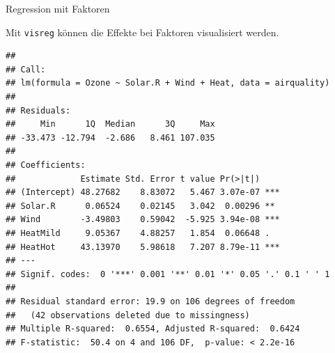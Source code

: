 \documentclass[ignorenonframetext,]{beamer}
\newenvironment{Shaded}{}{}
\newcommand{\KeywordTok}[1]{\textcolor[rgb]{0.00,0.44,0.13}{\textbf{{#1}}}}
\newcommand{\DataTypeTok}[1]{\textcolor[rgb]{0.56,0.13,0.00}{{#1}}}
\newcommand{\DecValTok}[1]{\textcolor[rgb]{0.25,0.63,0.44}{{#1}}}
\newcommand{\StringTok}[1]{\textcolor[rgb]{0.25,0.44,0.63}{{#1}}}
\newcommand{\NormalTok}[1]{{#1}}
\begin{document}
\begin{frame}[fragile]{Regression mit Faktoren}

Mit \texttt{visreg} können die Effekte bei Faktoren visualisiert werden.

\begin{Shaded}
\end{Shaded}

\begin{verbatim}
## 
## Call:
## lm(formula = Ozone ~ Solar.R + Wind + Heat, data = airquality)
## 
## Residuals:
##     Min      1Q  Median      3Q     Max 
## -33.473 -12.794  -2.686   8.461 107.035 
## 
## Coefficients:
##             Estimate Std. Error t value Pr(>|t|)    
## (Intercept) 48.27682    8.83072   5.467 3.07e-07 ***
## Solar.R      0.06524    0.02145   3.042  0.00296 ** 
## Wind        -3.49803    0.59042  -5.925 3.94e-08 ***
## HeatMild     9.05367    4.88257   1.854  0.06648 .  
## HeatHot     43.13970    5.98618   7.207 8.79e-11 ***
## ---
## Signif. codes:  0 '***' 0.001 '**' 0.01 '*' 0.05 '.' 0.1 ' ' 1
## 
## Residual standard error: 19.9 on 106 degrees of freedom
##   (42 observations deleted due to missingness)
## Multiple R-squared:  0.6554, Adjusted R-squared:  0.6424 
## F-statistic:  50.4 on 4 and 106 DF,  p-value: < 2.2e-16
\end{verbatim}

\end{frame}
\end{document}
